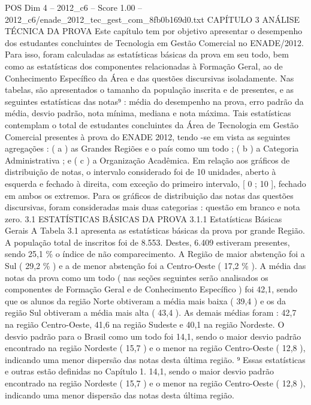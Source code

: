 \begin{textsample}{POS Dim 4 – 2012\_c6 – Score 1.00 – 2012\_c6/enade\_2012\_tec\_gest\_com\_8fb0b169d0.txt}  \label{ex:f4_pos_126}
CAPÍTULO 3 ANÁLISE TÉCNICA DA PROVA Este capítulo tem por objetivo apresentar o desempenho dos estudantes concluintes de Tecnologia em Gestão Comercial no ENADE/2012.
Para isso, foram calculadas as estatísticas básicas da prova em seu todo, bem como as estatísticas dos componentes relacionadas à Formação Geral, ao de Conhecimento Específico da Área e das questões discursivas isoladamente.
Nas tabelas, são apresentados o tamanho da população inscrita e de presentes, e as seguintes estatísticas das notas⁹ : média do desempenho na prova, erro padrão da média, desvio padrão, nota mínima, mediana e nota máxima.
Tais estatísticas contemplam o total de estudantes concluintes da Área de Tecnologia em Gestão Comercial presentes à prova do ENADE 2012, tendo -se em vista as seguintes agregações : ( a ) as Grandes Regiões e o país como um todo ; ( b ) a Categoria Administrativa ; e ( c ) a Organização Acadêmica.
Em relação aos gráficos de distribuição de notas, o intervalo considerado foi de 10 unidades, aberto à esquerda e fechado à direita, com exceção do primeiro intervalo, [ 0 ; 10 ], fechado em ambos os extremos.
Para os gráficos de distribuição das notas das questões discursivas, foram consideradas mais duas categorias : questão em branco e nota zero. 3.1 ESTATÍSTICAS BÁSICAS DA PROVA 3.1.1 Estatísticas Básicas Gerais A Tabela 3.1 apresenta as estatísticas básicas da prova por grande Região.
A população total de inscritos foi de 8.553.
Destes, 6.409 estiveram presentes, sendo 25,1 \% o índice de não comparecimento.
A Região de maior abstenção foi a Sul ( 29,2 \% ) e a de menor abstenção foi a Centro-Oeste ( 17,2 \% ).
A média das notas da prova como um todo ( nas seções seguintes serão analisados os componentes de Formação Geral e de Conhecimento Específico ) foi 42,1, sendo que os alunos da região Norte obtiveram a média mais baixa ( 39,4 ) e os da região Sul obtiveram a média mais alta ( 43,4 ).
As demais médias foram : 42,7 na região Centro-Oeste, 41,6 na região Sudeste e 40,1 na região Nordeste.
O desvio padrão para o Brasil como um todo foi 14,1, sendo o maior desvio padrão encontrado na região Nordeste ( 15,7 ) e o menor na região Centro-Oeste ( 12,8 ), indicando uma menor dispersão das notas desta última região. ⁹ Essas estatísticas e outras estão definidas no Capítulo 1. 14,1, sendo o maior desvio padrão encontrado na região Nordeste ( 15,7 ) e o menor na região Centro-Oeste ( 12,8 ), indicando uma menor dispersão das notas desta última região.

\end{textsample}
